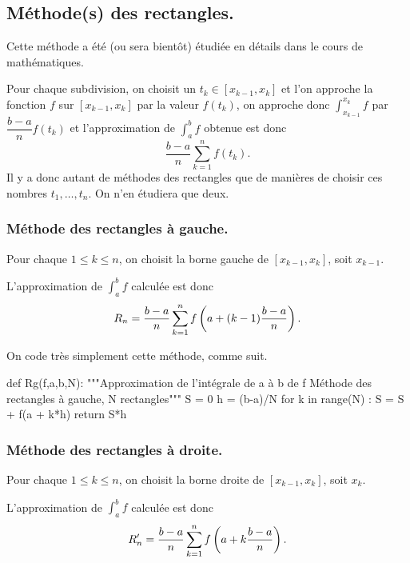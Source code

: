\subsection{Méthode(s) des rectangles.}

Cette méthode a été (ou sera bientôt) étudiée en détails dans le cours de mathématiques. 

Pour chaque subdivision, on choisit un $t_k\in[x_{k-1},x_{k}]$ et l'on approche la fonction $f$ sur $[x_{k-1},x_{k}]$ par la valeur $f(t_k)$, on approche donc $\displaystyle\int_{x_{k-1}}^{x_{k}} f$ par $\dfrac{b-a}{n} f(t_k)$ et l'approximation de  $\displaystyle\int_a^b f$ obtenue est donc 
\begin{equation*}
  \dfrac{b-a}{n} \sum_{k=1}^n f(t_k).
\end{equation*}
Il y a donc autant de méthodes des rectangles que de manières de choisir ces nombres $t_1,\dots,t_n$. On n'en étudiera que deux. 



\subsubsection{Méthode des rectangles à gauche.}

Pour chaque $1 \leq k \leq n$, on choisit la borne gauche de $[x_{k-1},x_{k}]$, soit $x_{k-1}$.

L'approximation de  $\displaystyle\int_a^b f$ calculée est donc 
\begin{equation*}
  R_n = \dfrac{b-a}{n} \sum_{k=1}^n f\left( a+(k-1)\dfrac{b-a}{n}\right).
\end{equation*}

On code très simplement cette méthode, comme suit. 

\begin{pyverbatim}
def Rg(f,a,b,N):
    """Approximation de l'intégrale de a à b de f 
    Méthode des rectangles à gauche, N rectangles"""
    S = 0
    h = (b-a)/N
    for k in range(N) : 
        S = S + f(a + k*h)
    return S*h
\end{pyverbatim}

\subsubsection{Méthode des rectangles à droite.}

Pour chaque $1 \leq k \leq n$, on choisit la borne droite de $[x_{k-1},x_{k}]$, soit $x_k$.

L'approximation de  $\displaystyle\int_a^b f$ calculée est donc 
\begin{equation*}
  R_n' = \dfrac{b-a}{n} \sum_{k=1}^n f\left( a+k\dfrac{b-a}{n}\right).
\end{equation*}


